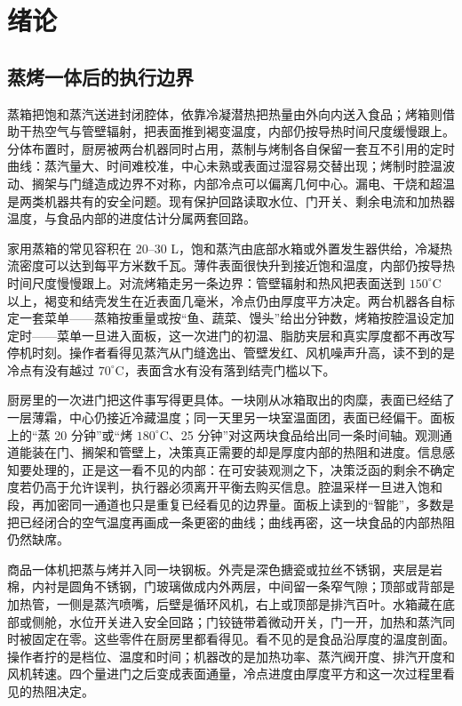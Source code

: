 \chapter{绪论}
\label{ch:intro}

\section{蒸烤一体后的执行边界}

蒸箱把饱和蒸汽送进封闭腔体，依靠冷凝潜热把热量由外向内送入食品；烤箱则借助干热空气与管壁辐射，把表面推到褐变温度，内部仍按导热时间尺度缓慢跟上。分体布置时，厨房被两台机器同时占用，蒸制与烤制各自保留一套互不引用的定时曲线：蒸汽量大、时间难校准，中心未熟或表面过湿容易交替出现；烤制时腔温波动、搁架与门缝造成边界不对称，内部冷点可以偏离几何中心\cite{feyissa2013}。漏电、干烧和超温是两类机器共有的安全问题。现有保护回路读取水位、门开关、剩余电流和加热器温度，与食品内部的进度估计分属两套回路。

家用蒸箱的常见容积在 20--30 L，饱和蒸汽由底部水箱或外置发生器供给，冷凝热流密度可以达到每平方米数千瓦。薄件表面很快升到接近饱和温度，内部仍按导热时间尺度慢慢跟上。对流烤箱走另一条边界：管壁辐射和热风把表面送到 \(150^\circ\mathrm{C}\) 以上，褐变和结壳发生在近表面几毫米，冷点仍由厚度平方决定。两台机器各自标定一套菜单——蒸箱按重量或按“鱼、蔬菜、馒头”给出分钟数，烤箱按腔温设定加定时——菜单一旦进入面板，这一次进门的初温、脂肪夹层和真实厚度都不再改写停机时刻。操作者看得见蒸汽从门缝逸出、管壁发红、风机噪声升高，读不到的是冷点有没有越过 \(70^\circ\mathrm{C}\)，表面含水有没有落到结壳门槛以下。

厨房里的一次进门把这件事写得更具体。一块刚从冰箱取出的肉糜，表面已经结了一层薄霜，中心仍接近冷藏温度；同一天里另一块室温面团，表面已经偏干。面板上的“蒸 20 分钟”或“烤 \(180^\circ\mathrm{C}\)、25 分钟”对这两块食品给出同一条时间轴。观测通道能装在门、搁架和管壁上，决策真正需要的却是厚度内部的热阻和进度。信息感知要处理的，正是这一看不见的内部：在可安装观测之下，决策泛函的剩余不确定度若仍高于允许误判，执行器必须离开平衡去购买信息。腔温采样一旦进入饱和段，再加密同一通道也只是重复已经看见的边界量。面板上读到的“智能”，多数是把已经闭合的空气温度再画成一条更密的曲线；曲线再密，这一块食品的内部热阻仍然缺席。

商品一体机把蒸与烤并入同一块钢板。外壳是深色搪瓷或拉丝不锈钢，夹层是岩棉，内衬是圆角不锈钢，门玻璃做成内外两层，中间留一条窄气隙；顶部或背部是加热管，一侧是蒸汽喷嘴，后壁是循环风机，右上或顶部是排汽百叶。水箱藏在底部或侧舱，水位开关进入安全回路；门铰链带着微动开关，门一开，加热和蒸汽同时被固定在零。这些零件在厨房里都看得见。看不见的是食品沿厚度的温度剖面。操作者拧的是档位、温度和时间；机器改的是加热功率、蒸汽阀开度、排汽开度和风机转速。四个量进门之后变成表面通量，冷点进度由厚度平方和这一次过程里看见的热阻决定。

